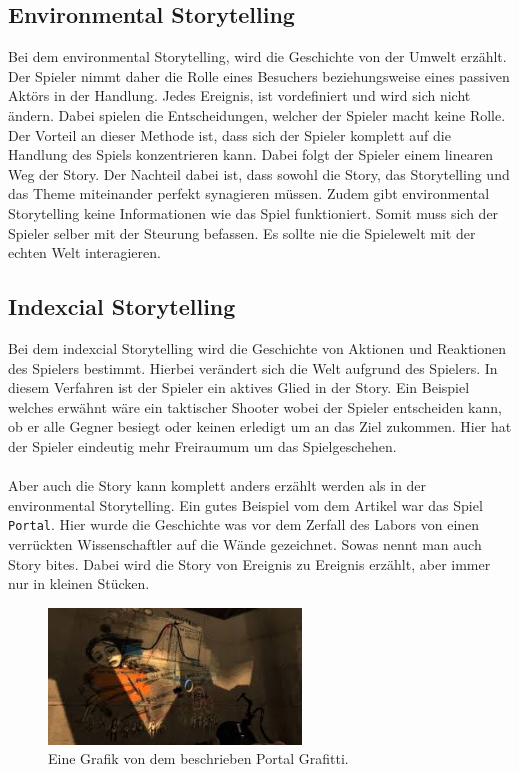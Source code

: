 \subsection{Environmental Storytelling}
Bei dem environmental Storytelling, wird die Geschichte von der Umwelt erzählt. Der Spieler nimmt daher die Rolle eines Besuchers beziehungsweise eines passiven Aktörs in der Handlung. Jedes Ereignis, ist vordefiniert und wird sich nicht ändern. Dabei spielen die Entscheidungen, welcher der Spieler macht keine Rolle. Der Vorteil an dieser Methode ist, dass sich der Spieler komplett auf die Handlung des Spiels konzentrieren kann. Dabei folgt der Spieler einem linearen Weg der Story. Der Nachteil dabei ist, dass sowohl die Story, das Storytelling und das Theme miteinander perfekt synagieren müssen. Zudem gibt environmental Storytelling keine Informationen wie das Spiel funktioniert. Somit muss sich der Spieler selber mit der Steurung befassen. Es sollte nie die Spielewelt mit der echten Welt interagieren.

\subsection{Indexcial Storytelling}
Bei dem indexcial Storytelling wird die Geschichte von Aktionen und Reaktionen des Spielers bestimmt. Hierbei verändert sich die Welt aufgrund des Spielers. In diesem Verfahren ist der Spieler ein aktives Glied in der Story. Ein Beispiel welches  erwähnt wäre ein taktischer Shooter wobei der Spieler entscheiden kann, ob er alle Gegner besiegt oder keinen erledigt um an das Ziel zukommen. Hier hat der Spieler eindeutig mehr Freiraumum um das Spielgeschehen.\\\\
Aber auch die Story kann komplett anders erzählt werden als in der environmental Storytelling. Ein gutes Beispiel vom dem Artikel  war das Spiel \verb+Portal+. Hier wurde die Geschichte was vor dem Zerfall des Labors von einen verrückten Wissenschaftler auf die Wände gezeichnet. Sowas nennt man auch Story bites. Dabei wird die Story von Ereignis zu Ereignis erzählt, aber immer nur in kleinen Stücken.
\begin{figure}[H]
    \centering
    \includegraphics[width=0.6\textwidth]{chapters/15/images/Portal.png}
    \caption{Eine Grafik von dem beschrieben Portal Grafitti.}
    \label{UST-6}
\end{figure}

